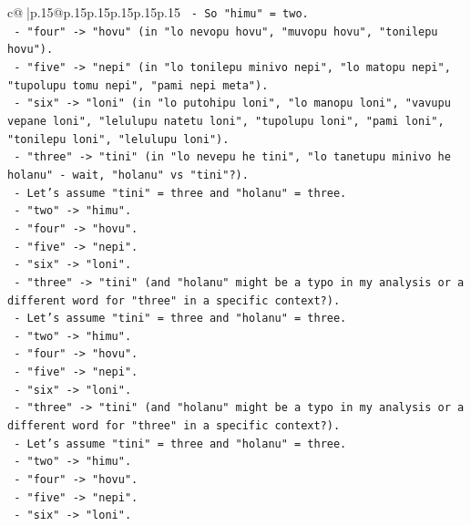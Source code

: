 \documentclass{article}
\begin{document}
{\begin{supertabular}{c@{$\;$}|p{.15\linewidth}@{}p{.15\linewidth}p{.15\linewidth}p{.15\linewidth}p{.15\linewidth}p{.15\linewidth}}
{{{\texttt{            {-} So "himu" = two.} \\
\texttt{            {-} "four" {-}> "hovu" (in "lo nevopu hovu", "muvopu hovu", "tonilepu hovu").} \\
\texttt{            {-} "five" {-}> "nepi" (in "lo tonilepu minivo nepi", "lo matopu nepi", "tupolupu tomu nepi", "pami nepi meta").} \\
\texttt{            {-} "six" {-}> "loni" (in "lo putohipu loni", "lo manopu loni", "vavupu vepane loni", "lelulupu natetu loni", "tupolupu loni", "pami loni", "tonilepu loni", "lelulupu loni").} \\
\texttt{            {-} "three" {-}> "tini" (in "lo nevepu he tini", "lo tanetupu minivo he holanu" {-} wait, "holanu" vs "tini"?).} \\
\texttt{            {-} Let's assume "tini" = three and "holanu" = three.} \\
\texttt{            {-} "two" {-}> "himu".} \\
\texttt{            {-} "four" {-}> "hovu".} \\
\texttt{            {-} "five" {-}> "nepi".} \\
\texttt{            {-} "six" {-}> "loni".} \\
\texttt{            {-} "three" {-}> "tini" (and "holanu" might be a typo in my analysis or a different word for "three" in a specific context?).} \\
\texttt{            {-} Let's assume "tini" = three and "holanu" = three.} \\
\texttt{            {-} "two" {-}> "himu".} \\
\texttt{            {-} "four" {-}> "hovu".} \\
\texttt{            {-} "five" {-}> "nepi".} \\
\texttt{            {-} "six" {-}> "loni".} \\
\texttt{            {-} "three" {-}> "tini" (and "holanu" might be a typo in my analysis or a different word for "three" in a specific context?).} \\
\texttt{            {-} Let's assume "tini" = three and "holanu" = three.} \\
\texttt{            {-} "two" {-}> "himu".} \\
\texttt{            {-} "four" {-}> "hovu".} \\
\texttt{            {-} "five" {-}> "nepi".} \\
\texttt{            {-} "six" {-}> "loni".} \\
}}}
\end{supertabular}}
\end{document}
